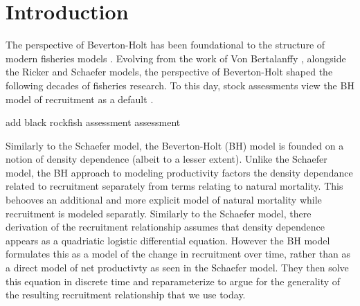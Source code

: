 %
\section{\color{red}Introduction\label{ptInt}}

%
The perspective of Beverton-Holt \cite{beverton_dynamics_1957} has been 
foundational to the structure of modern fisheries models \cite{holden_beverton_1995}. 
Evolving from the work of Von Bertalanffy \cite{von_bertalanffy_quantitative_1938}, 
alongside the Ricker \cite{ricker_stock_1954} and Schaefer \cite{schaefer_study_1957}   
models, the perspective of Beverton-Holt shaped the following decades of fisheries 
research. To this day, stock assessments view the BH model of recruitment as a 
default \cite{methot_stock_2013}. %

{\color{red} add black rockfish assessment assessment}


%
%
%
Similarly to the Schaefer model, the Beverton-Holt (BH) model 
\cite{beverton_dynamics_1957} is founded on a notion of density 
dependence \cite{gotelli_primer_1995} (albeit to a lesser extent). 
Unlike the Schaefer model, the BH approach to modeling productivity factors the 
density dependance related to recruitment separately from terms relating to 
natural mortality. This behooves an additional and more explicit model of 
natural mortality \cite{beverton_review_1959} while recruitment is modeled 
separatly. Similarly to the Schaefer model, there derivation of the recruitment 
relationship assumes that density dependence appears as a quadriatic logistic 
differential equation. However the BH model formulates this as a model of the 
change in recruitment over time, rather than as a direct model of net productivty 
as seen in the Schaefer model. They then solve this equation in discrete time 
and reparameterize to argue for the generality of the resulting recruitment 
relationship that we use today. 

